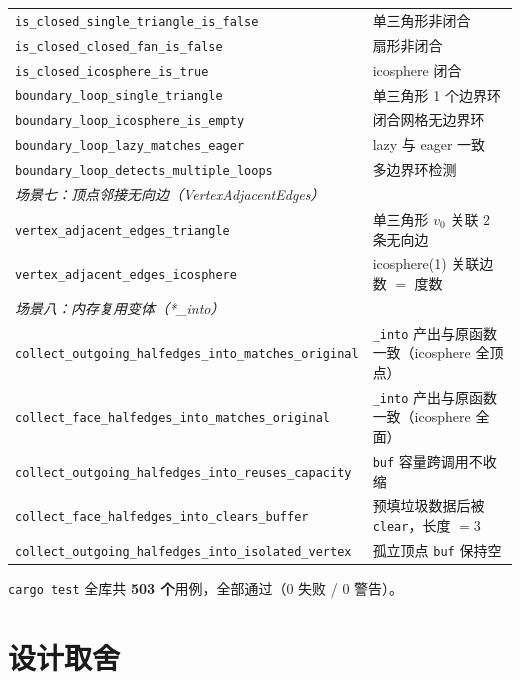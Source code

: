 \documentclass[11pt,a4paper]{article}
\begin{document}
{\begin{longtable}{@{}ll@{}}
  \texttt{is\_closed\_single\_triangle\_is\_false}             & 单三角形非闭合 \\
  \texttt{is\_closed\_closed\_fan\_is\_false}                  & 扇形非闭合 \\
  \texttt{is\_closed\_icosphere\_is\_true}                     & icosphere 闭合 \\
  \texttt{boundary\_loop\_single\_triangle}                    & 单三角形 1 个边界环 \\
  \texttt{boundary\_loop\_icosphere\_is\_empty}                & 闭合网格无边界环 \\
  \texttt{boundary\_loop\_lazy\_matches\_eager}                & lazy 与 eager 一致 \\
  \texttt{boundary\_loop\_detects\_multiple\_loops}            & 多边界环检测 \\
  \midrule
  \multicolumn{2}{l}{\textit{场景七：顶点邻接无向边（VertexAdjacentEdges）}} \\
  \texttt{vertex\_adjacent\_edges\_triangle}                   & 单三角形 $v_0$ 关联 2 条无向边 \\
  \texttt{vertex\_adjacent\_edges\_icosphere}                  & icosphere(1) 关联边数 $=$ 度数 \\
  \midrule
  \multicolumn{2}{l}{\textit{场景八：内存复用变体（*\_into）}} \\
  \texttt{collect\_outgoing\_halfedges\_into\_matches\_original} & \texttt{\_into} 产出与原函数一致（icosphere 全顶点） \\
  \texttt{collect\_face\_halfedges\_into\_matches\_original}     & \texttt{\_into} 产出与原函数一致（icosphere 全面） \\
  \texttt{collect\_outgoing\_halfedges\_into\_reuses\_capacity}  & \texttt{buf} 容量跨调用不收缩 \\
  \texttt{collect\_face\_halfedges\_into\_clears\_buffer}        & 预填垃圾数据后被 \texttt{clear}，长度 $=3$ \\
  \texttt{collect\_outgoing\_halfedges\_into\_isolated\_vertex}  & 孤立顶点 \texttt{buf} 保持空 \\
  \bottomrule
\end{longtable}
}

\texttt{cargo test} 全库共 \textbf{503 个}用例，全部通过（0 失败 / 0 警告）。

\section{设计取舍}
\end{document}
